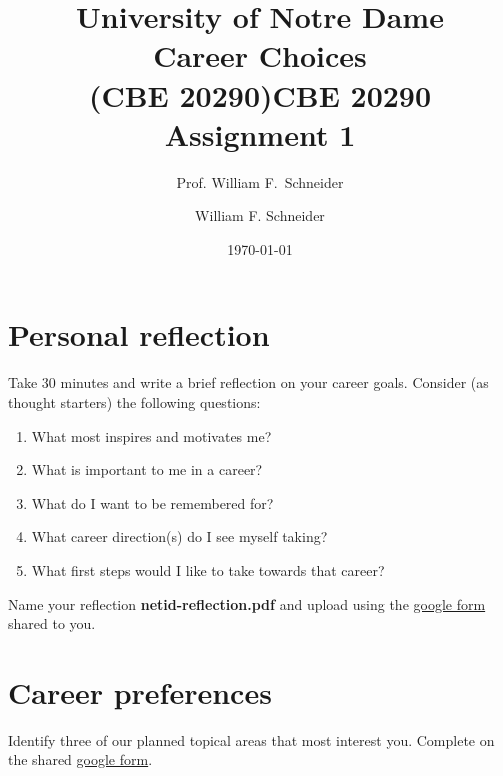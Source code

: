 \documentclass[11pt]{article}
\title{University of Notre Dame\\Career Choices\\(CBE 20290)}
\author{Prof. William F.\ Schneider}
\author{William F. Schneider}
\date{\today}
\title{CBE 20290 Assignment 1}
\begin{document}
\begin{OPTIONS}
\end{OPTIONS}
\section{Personal reflection}
\label{sec:orgd099529}
Take 30 minutes and write a brief reflection on your career goals. Consider (as thought starters) the following questions:

\begin{enumerate}
\item What most inspires and motivates me?
\item What is important to me in a career?
\item What do I want to be remembered for?
\item What career direction(s) do I see myself taking?
\item What first steps would I like to take towards that career?
\end{enumerate}

Name your reflection \textbf{netid-reflection.pdf} and upload using the \href{https://forms.gle/SQ2EKfksg5Z5b3Zs5}{google form} shared to you.

\section{Career preferences}
\label{sec:org935516a}
Identify three of our planned topical areas that most interest you. Complete on the shared \href{https://forms.gle/SQ2EKfksg5Z5b3Zs5}{google form}.
\end{document}

